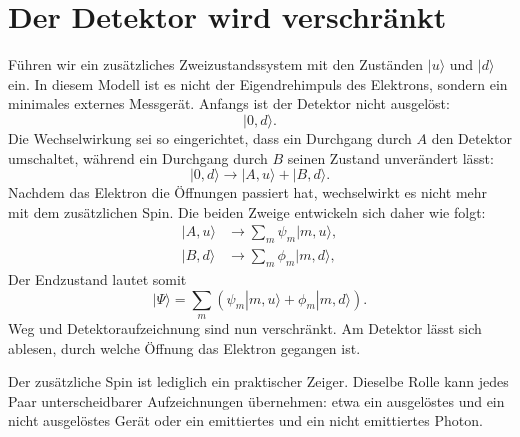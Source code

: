 \section{Der Detektor wird verschränkt}

Führen wir ein zusätzliches Zweizustandssystem mit den Zuständen \(|u\rangle\) und \(|d\rangle\) ein. In diesem Modell ist es nicht der Eigendrehimpuls des Elektrons, sondern ein minimales externes Messgerät. Anfangs ist der Detektor nicht ausgelöst:
\begin{equation}
|0,d\rangle.
\end{equation}
Die Wechselwirkung sei so eingerichtet, dass ein Durchgang durch \(A\) den Detektor umschaltet, während ein Durchgang durch \(B\) seinen Zustand unverändert lässt:
\begin{equation}
|0,d\rangle
\longrightarrow
|A,u\rangle+|B,d\rangle.
\end{equation}
Nachdem das Elektron die Öffnungen passiert hat, wechselwirkt es nicht mehr mit dem zusätzlichen Spin. Die beiden Zweige entwickeln sich daher wie folgt:
\begin{align}
|A,u\rangle &\longrightarrow \sum_m\psi_m|m,u\rangle, \\
|B,d\rangle &\longrightarrow \sum_m\phi_m|m,d\rangle,
\end{align}
Der Endzustand lautet somit
\begin{equation}
|\Psi\rangle
=\sum_m\left(\psi_m|m,u\rangle+\phi_m|m,d\rangle\right).
\end{equation}
Weg und Detektoraufzeichnung sind nun verschränkt. Am Detektor lässt sich ablesen, durch welche Öffnung das Elektron gegangen ist.

\begin{classroomqa}
\end{classroomqa}

Der zusätzliche Spin ist lediglich ein praktischer Zeiger. Dieselbe Rolle kann jedes Paar unterscheidbarer Aufzeichnungen übernehmen: etwa ein ausgelöstes und ein nicht ausgelöstes Gerät oder ein emittiertes und ein nicht emittiertes Photon.

